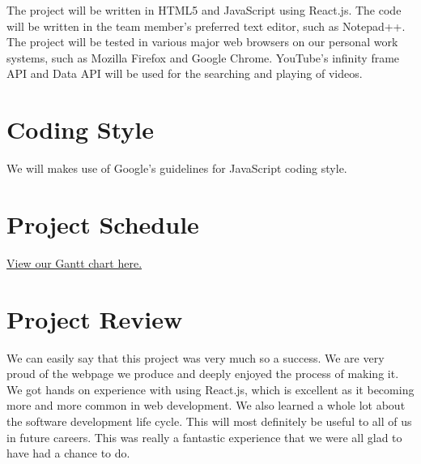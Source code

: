 \documentclass{article}
\begin{document}
The project will be written in HTML5 and JavaScript using React.js. The code will be written in the team member's preferred text editor, such as Notepad++. The project will be tested in various major web browsers on our personal work systems, such as Mozilla Firefox and Google Chrome. YouTube's infinity frame API and Data API will be used for the searching and playing of videos.

\section{Coding Style}

We will makes use of Google’s guidelines for JavaScript coding style.

\section{Project Schedule}

\href{https://gitlab.cas.mcmaster.ca/delalik/Shuffle/blob/master/ProjectSchedule/Shuffle.gan}{View our Gantt chart here.}

\section{Project Review}
\color{red}
We can easily say that this project was very much so a success.  We are very proud of the webpage we produce and deeply enjoyed the process of making it.  We got hands on experience with using React.js, which is excellent as it becoming more and more common in web development.  We also learned a whole lot about the software development life cycle.  This will most definitely be useful to all of us in future careers.  This was really a fantastic experience that we were all glad to have had a chance to do. 
\end{document}
